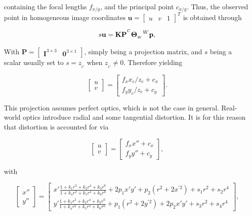 containing the focal lengths $f_{x/y}$, and the principal point $c_{x/y}$. Thus, the observed point in homogeneous image coordinates $\mathbf{u} = \begin{bmatrix}
    u & v & 1
\end{bmatrix}^T$ is obtained through

\begin{equation}
    s\mathbf{u} = \mathbf{K} \mathbf{P} {}^{^C}\mathbf{\Theta}_{_W} {}^W\mathbf{p},
\end{equation}

With $\mathbf{P} = \begin{bmatrix}
    \mathbf{I}^{3\times3} &  \mathbf{0}^{3\times1}
\end{bmatrix}$, simply being a projection matrix, and $s$ being a scalar usually set to $s = z_{_C}$ when $z_{_C} \neq 0$. Therefore yielding

\begin{equation}
    \begin{bmatrix}
        u \\
        v
    \end{bmatrix} = \begin{bmatrix}
        f_x x_c/z_c + c_x \\
        f_y y_c/z_c + c_y
    \end{bmatrix}.
\end{equation}

This projection assumes perfect optics, which is not the case in general. Real-world optics introduce radial and some tangential distortion. It is for this reason that distortion is accounted for via

\begin{equation}
    \begin{bmatrix}
        u \\
        v
    \end{bmatrix} = \begin{bmatrix}
        f_x x'' + c_x \\
        f_y y'' + c_y
    \end{bmatrix},
\end{equation}

with

\begin{equation}
    \begin{bmatrix}
        x'' \\
        y''
    \end{bmatrix}=\begin{bmatrix}
        x' \frac{1+k_1 r^2+k_2 r^4+k_3 r^6}{1+k_4 r^2+k_5 r^4+k_6 r^6}+2 p_1 x' y'+p_2\left(r^2+2 x^{\prime 2}\right)+s_1 r^2+s_2 r^4 \\
        y' \frac{1+k_1 r^2+k_2 r^4+k_3 r^6}{1+k_4 r^2+k_5 r^4+k_6 r^6}+p_1\left(r^2+2 y^{\prime 2}\right)+2 p_2 x' y'+s_3 r^2+s_4 r^4
    \end{bmatrix},
\end{equation}

